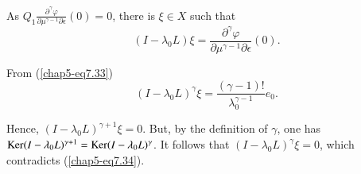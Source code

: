 As $Q_{1} \frac{\partial^{\gamma}\varphi}{\partial \mu^{\gamma - 1}
  \partial \epsilon} (0) = 0$, there is $\xi \in X$ such that
$$
(I - \lambda_{0} L) \xi = \frac{\partial^{\gamma}\varphi}{\partial
  \mu^{\gamma - 1}\partial \epsilon} (0).
$$

From (\ref{chap5-eq7.33})
\begin{equation*}
(I - \lambda_{0}L)^{\gamma} \xi = \frac{(\gamma -
    1)!}{\lambda_{0}^{\gamma - 1}} e_{0}.\tag{7.34}\label{chap5-eq7.34}
\end{equation*}

Hence, $(I - \lambda_{0}L)^{\gamma + 1} \xi = 0$. But, by the
definition of $\gamma$, one has $\operatorname{Ker} (I - \lambda_{0}L)^{\gamma + 1} =
\operatorname{Ker} (I - \lambda_{0}L)^{\gamma}$. It follows that $(I -
\lambda_{0}L)^{\gamma} \xi = 0$, which contradicts
(\ref{chap5-eq7.34}).

